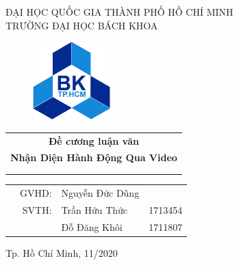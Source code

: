 \begin{titlepage}
    \begin{center} \large
        ĐẠI HỌC QUỐC GIA THÀNH PHỐ HỒ CHÍ MINH \\
        TRƯỜNG ĐẠI HỌC BÁCH KHOA
    \end{center}

    \vspace{1.5cm}

    \begin{figure}[h!]
        \begin{center}
            \includegraphics[width=3cm]{asset/image/hcmut-logo.jpg}
        \end{center}
    \end{figure}

    \vspace{1cm}

    \begin{center}
        \begin{tabular}{c}
            {\bf \large Đề cương luận văn}             \\

            {\bf \large Nhận Diện Hành Động Qua Video} \\

            \\ \hline \hline \\
        \end{tabular}
    \end{center}

    \vspace{1cm}

    \begin{table}[h]
        \begin{tabular}{rrll}
            \hspace{2.8cm}
             & \large  GVHD:
             & \large Nguyễn Đức Dũng &                                      \\
             & \large  SVTH:
             & \large Trần Hữu Thức   & \large 1713454                       \\
             &                        & \large Đỗ Đăng Khôi & \large 1711807 \\
        \end{tabular}
    \end{table}

    \vspace{2cm}

    \begin{center}
        {\large Tp. Hồ Chí Minh, 11/2020}
    \end{center}
\end{titlepage}
